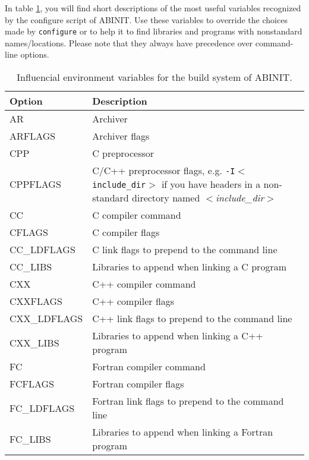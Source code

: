 In table \ref{tab:env-summary}, you will find short descriptions of the
most useful variables recognized by the configure script of ABINIT.
Use these variables to override the choices made by \texttt{configure}
or to help it to find libraries and programs with nonstandard
names/locations. Please note that they always have precedence over
command-line options.
\\

\begin{table}
\begin{center}
\begin{tabular}{|l|p{12cm}|}
\hline
\textbf{Option} & \textbf{Description} \\
\hline
AR           & Archiver \\
ARFLAGS      & Archiver flags \\
\hline
CPP          & C preprocessor \\
CPPFLAGS     & C/C++ preprocessor flags, e.g. \texttt{-I$<$include\_dir$>$}
               if you have headers in a non-standard directory named
               \textit{$\mathit{<}$include\_dir$\mathit{>}$} \\
\hline
CC           & C compiler command \\
CFLAGS       & C compiler flags \\
CC\_LDFLAGS  & C link flags to prepend to the command line \\
CC\_LIBS     & Libraries to append when linking a C program \\
\hline
CXX          & C++ compiler command \\
CXXFLAGS     & C++ compiler flags \\
CXX\_LDFLAGS & C++ link flags to prepend to the command line \\
CXX\_LIBS    & Libraries to append when linking a C++ program \\
\hline
FC           & Fortran compiler command \\
FCFLAGS      & Fortran compiler flags \\
FC\_LDFLAGS  & Fortran link flags to prepend to the command line \\
FC\_LIBS     & Libraries to append when linking a Fortran program \\
\hline
\end{tabular}
\end{center}
\caption{Influencial environment variables for the build system of ABINIT.}
\label{tab:env-summary}
\end{table}

